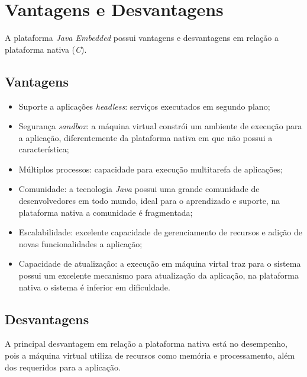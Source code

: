 \newpage
\section{Vantagens e Desvantagens}

A plataforma \textit{Java Embedded} possui vantagens e desvantagens em relação 
a plataforma nativa (\textit{C}).

\subsection{Vantagens}

\begin{itemize}
    
	\item Suporte a aplicações \textit{headless}: serviços executados em 
	segundo plano;
    
	\item Segurança \textit{sandbox}: a máquina virtual constrói um ambiente de 
	execução para a aplicação, diferentemente da plataforma nativa em que não 
	possui a característica;
    
	\item Múltiplos processos: capacidade para execução multitarefa de 
	aplicações;
    
	\item Comunidade: a tecnologia \textit{Java} possui uma grande comunidade 
	de desenvolvedores em todo mundo, ideal para o aprendizado e suporte, na 
	plataforma nativa a comunidade é fragmentada;
    
	\item Escalabilidade: excelente capacidade de gerenciamento de recursos e 
	adição de novas funcionalidades a aplicação;
    
	\item Capacidade de atualização: a execução em máquina virtal traz para o 
	sistema possui um excelente mecanismo para atualização da aplicação, na 
	plataforma nativa o sistema é inferior em dificuldade.
    
\end{itemize}

\subsection{Desvantagens}

A principal desvantagem em relação a plataforma nativa está no desempenho, pois 
a máquina virtual utiliza de recursos como memória e processamento, além dos 
requeridos para a aplicação.


